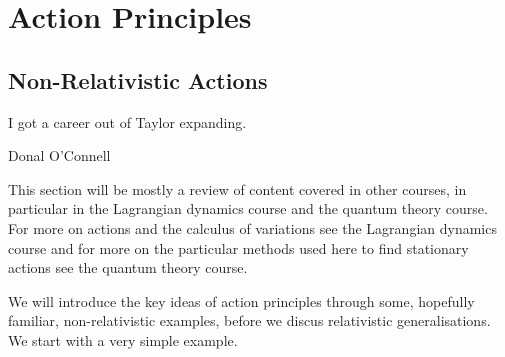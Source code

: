 \part{Action Principles}
\chapter{Non-Relativistic Actions}
\epigraph{I got a career out of Taylor expanding.}{Donal O'Connell}

This section will be mostly a review of content covered in other courses, in particular in the Lagrangian dynamics course and the quantum theory course.
For more on actions and the calculus of variations see the Lagrangian dynamics course and for more on the particular methods used here to find stationary actions see the quantum theory course.

We will introduce the key ideas of action principles through some, hopefully familiar, non-relativistic examples, before we discus relativistic generalisations.
We start with a very simple example.

